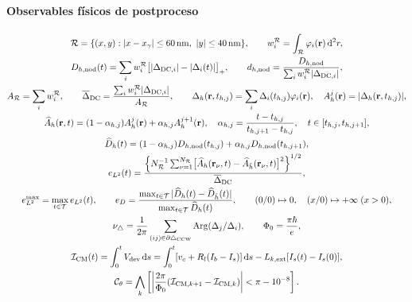 \paragraph{Observables físicos de postproceso}
\begin{gather}
 {\cal R}=\{(x,y):|x-x_\gamma|\leq60\,\mathrm{nm},
                    \ |y|\leq40\,\mathrm{nm}\},\qquad
 w_i^{\cal R}=\int_{\cal R}\varphi_i(\mathbf r)\,\mathrm d^2r,\\
 D_{h,\rm nod}(t)
 =\sum_i w_i^{\cal R}
 \bigl[|\Delta_{{\rm DC},i}|-|\Delta_i(t)|\bigr]_+,\qquad
 d_{h,\rm nod}
 =\frac{D_{h,\rm nod}}{\sum_iw_i^{\cal R}|\Delta_{{\rm DC},i}|},\\
 A_{\cal R}=\sum_iw_i^{\cal R},\qquad
 \overline\Delta_{\rm DC}
 =\frac{\sum_iw_i^{\cal R}|\Delta_{{\rm DC},i}|}{A_{\cal R}},\qquad
 \Delta_h(\mathbf r,t_{h,j})=\sum_i\Delta_i(t_{h,j})\varphi_i(\mathbf r),\quad
 A_h^j(\mathbf r)=|\Delta_h(\mathbf r,t_{h,j})|,\\
 \widehat A_h(\mathbf r,t)=(1-\alpha_{h,j})A_h^j(\mathbf r)
                  +\alpha_{h,j} A_h^{j+1}(\mathbf r),\quad
 \alpha_{h,j}=\frac{t-t_{h,j}}{t_{h,j+1}-t_{h,j}},\quad t\in[t_{h,j},t_{h,j+1}],\\
 \widehat D_h(t)=(1-\alpha_{h,j})D_{h,\rm nod}(t_{h,j})
                  +\alpha_{h,j}D_{h,\rm nod}(t_{h,j+1}),\\
 e_{L^2}(t)=
 \frac{\left\{N_{\cal R}^{-1}\sum_{\nu=1}^{N_{\cal R}}
       \bigl[\widehat A_h(\mathbf r_\nu,t)
       -\widehat A_{\tilde h}(\mathbf r_\nu,t)\bigr]^2
       \right\}^{1/2}}{\overline\Delta_{\rm DC}},\\
 e_{L^2}^{\max}=\max_{t\in{\cal T}}e_{L^2}(t),\qquad
 e_D=\frac{\max_{t\in{\cal T}}|\widehat D_h(t)-\widehat D_{\tilde h}(t)|}
 {\max_{t\in{\cal T}}\widehat D_h(t)},\qquad
 (0/0)\mapsto0,\quad(x/0)\mapsto+\infty\;(x>0),\\
 \nu_\triangle=\frac1{2\pi}\sum_{(ij)\in\partial\triangle_{\rm CCW}}
             \operatorname{Arg}(\Delta_j/\Delta_i),\qquad
 \Phi_0=\frac{\pi\hbar}{e},\\
 {\cal I}_{\rm CM}(t)=\int_0^tV_{\rm dev}\,\mathrm ds
 =\int_0^t[v_c+R_l(I_b-I_s)]\,\mathrm ds
       -L_{k,\rm ext}[I_s(t)-I_s(0)],\\
 {\cal C}_{\theta}=
 \bigwedge_k
 \left[
 \left|\frac{2\pi}{\Phi_0}
   ({\cal I}_{{\rm CM},k+1}-{\cal I}_{{\rm CM},k})\right|
 <\pi-10^{-8}
 \right].
\end{gather}
